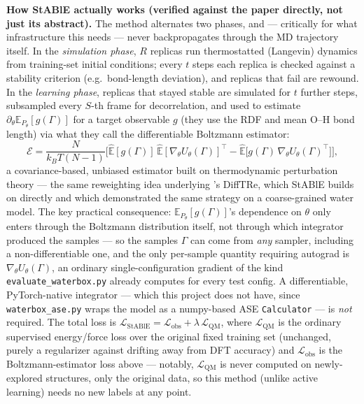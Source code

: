 \documentclass[11pt]{article}
\begin{document}
\textbf{How StABlE actually works (verified against the paper directly, not
just its abstract).} The method alternates two phases, and --- critically
for what infrastructure this needs --- never backpropagates through the MD
trajectory itself. In the \emph{simulation phase}, $R$ replicas run
thermostatted (Langevin) dynamics from training-set initial conditions;
every $t$ steps each replica is checked against a stability criterion
(e.g.\ bond-length deviation), and replicas that fail are rewound. In the
\emph{learning phase}, replicas that stayed stable are simulated for $t$
further steps, subsampled every $S$-th frame for decorrelation, and used to
estimate $\partial_\theta \mathbb{E}_{P_\theta}[g(\Gamma)]$ for a target
observable $g$ (they use the RDF and mean O--H bond length) via what they
call the differentiable Boltzmann estimator:
\[
\mathcal{E} = \frac{N}{k_BT(N-1)}\Big[\hat{\mathbb{E}}[g(\Gamma)]\,
\hat{\mathbb{E}}[\nabla_\theta U_\theta(\Gamma)]^\top -
\hat{\mathbb{E}}\big[g(\Gamma)\,\nabla_\theta U_\theta(\Gamma)^\top\big]\Big],
\]
a covariance-based, unbiased estimator built on thermodynamic perturbation
theory \citep{zwanzig1954} --- the same reweighting idea underlying
\citet{thaler2021difftre}'s DiffTRe, which StABlE builds on directly and
which demonstrated the same strategy on a coarse-grained water model. The
key practical consequence: $\mathbb{E}_{P_\theta}[g(\Gamma)]$'s dependence
on $\theta$ only enters through the Boltzmann distribution itself, not
through which integrator produced the samples --- so the samples $\Gamma$
can come from \emph{any} sampler, including a non-differentiable one, and
the only per-sample quantity requiring autograd is
$\nabla_\theta U_\theta(\Gamma)$, an ordinary single-configuration gradient
of the kind \texttt{evaluate\_waterbox.py} already computes for every test
config. A differentiable, PyTorch-native integrator --- which this project
does not have, since \texttt{waterbox\_ase.py} wraps the model as a
numpy-based ASE \texttt{Calculator} --- is \emph{not} required. The total
loss is $\mathcal{L}_{\text{StABlE}} = \mathcal{L}_{\text{obs}} +
\lambda\,\mathcal{L}_{\text{QM}}$, where $\mathcal{L}_{\text{QM}}$ is the
ordinary supervised energy/force loss over the original fixed training set
(unchanged, purely a regularizer against drifting away from DFT accuracy)
and $\mathcal{L}_{\text{obs}}$ is the Boltzmann-estimator loss above ---
notably, $\mathcal{L}_{\text{QM}}$ is never computed on newly-explored
structures, only the original data, so this method (unlike active
learning) needs no new labels at any point.
\end{document}
